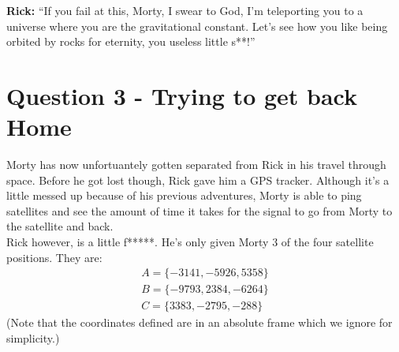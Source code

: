 \documentclass[a4paper, 12pt]{exam}
\begin{document}
\noindent \textbf{Rick:} “If you fail at this, Morty, I swear to God, I’m teleporting you to a universe where you are the gravitational constant. Let’s see how you like being orbited by rocks for eternity, you useless little s**!”

		

	
	\pagebreak
	
	\section*{Question 3 - Trying to get back Home}
	Morty has now unfortuantely gotten separated from Rick in his travel through space. Before he got lost though, Rick gave him a GPS tracker. Although it's a little messed up because of his previous adventures, Morty is able to ping satellites and see the amount of time it takes for the signal to go from Morty to the satellite and back. \\
	Rick however, is a little f*****. He's only given Morty 3 of the four satellite positions. They are:
	\begin{align*}
		A = \{-3141, -5926, 5358\}\\
		B = \{-9793, 2384, -6264\}\\
		C = \{3383, -2795, -288\}
	\end{align*}
	(Note that the coordinates defined are in an absolute frame which we ignore for simplicity.)
\end{document}
